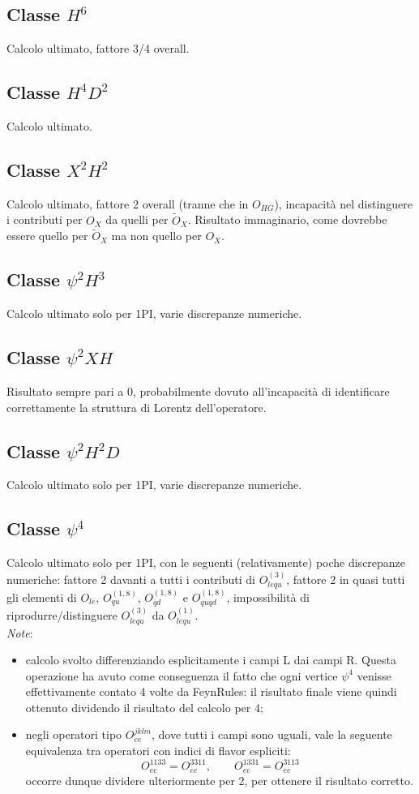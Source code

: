 \documentclass[a4paper,12pt]{article}
\newcommand{\beq}{\begin{equation}}
\newcommand{\eeq}{\end{equation}}
\newcommand{\bit}{\begin{itemize}}
\newcommand{\eit}{\end{itemize}}
\newcommand{\itm}{\item[-]}
\begin{document}
\subsection*{Classe $H^6$}
Calcolo ultimato, fattore 3/4 overall.
\subsection*{Classe $H^4D^2$}
Calcolo ultimato.
\subsection*{Classe $X^2H^2$}
Calcolo ultimato, fattore 2 overall (tranne che in $O_{HG}$), incapacità nel distinguere i contributi per $O_X$ da quelli per $\tilde O_X$. Risultato immaginario, come dovrebbe essere quello per $\tilde O_X$ ma non quello per $O_X$.
\subsection*{Classe $\psi^2H^3$}
Calcolo ultimato solo per 1PI, varie discrepanze numeriche.
\subsection*{Classe $\psi^2XH$}
Risultato sempre pari a 0, probabilmente dovuto all'incapacità di identificare correttamente la struttura di Lorentz dell'operatore.
\subsection*{Classe $\psi^2H^2D$}
Calcolo ultimato solo per 1PI, varie discrepanze numeriche.
\subsection*{Classe $\psi^4$}
Calcolo ultimato solo per 1PI, con le seguenti (relativamente) poche discrepanze numeriche: fattore 2 davanti a tutti i contributi di $O_{lequ}^{(3)}$, fattore 2 in quasi tutti gli elementi di $O_{le}$, $O_{qu}^{(1,8)}$, $O_{qd}^{(1,8)}$ e $O_{quqd}^{(1,8)}$, impossibilità di riprodurre/distinguere $O_{lequ}^{(3)}$ da $O_{lequ}^{(1)}$. \\
\emph{Note}:
\bit
\itm calcolo svolto differenziando esplicitamente i campi L dai campi R. Questa operazione ha avuto come conseguenza il fatto che ogni vertice $\psi^4$ venisse effettivamente contato 4 volte da FeynRules: il risultato finale viene quindi ottenuto dividendo il risultato del calcolo per 4;
\itm negli operatori tipo $O_{ee}^{jklm}$, dove tutti i campi sono uguali, vale la seguente equivalenza tra operatori con indici di flavor espliciti:
\beq
O_{ee}^{1133}=O_{ee}^{3311},\qquad O_{ee}^{1331}=O_{ee}^{3113} \nonumber
\eeq
occorre dunque dividere ulteriormente per 2, per ottenere il risultato corretto.
\eit
\end{document}
